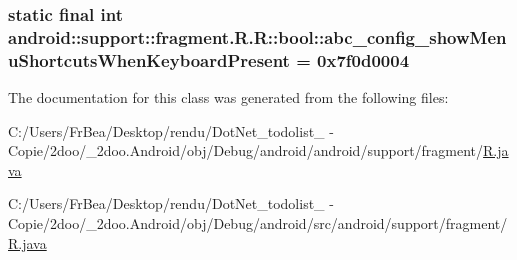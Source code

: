 \hypertarget{classandroid_1_1support_1_1fragment_1_1_r_1_1bool_09ff338b2b45baa2684ad6224df2544f}{
\subsubsection[{abc\_\-config\_\-showMenuShortcutsWhenKeyboardPresent}]{\setlength{\rightskip}{0pt plus 5cm}static final int android::support::fragment.R.R::bool::abc\_\-config\_\-showMenuShortcutsWhenKeyboardPresent = 0x7f0d0004}}
\label{classandroid_1_1support_1_1fragment_1_1_r_1_1bool_09ff338b2b45baa2684ad6224df2544f}




The documentation for this class was generated from the following files:\begin{CompactItemize}
\item 
C:/Users/FrBea/Desktop/rendu/DotNet\_\-todolist\_ - Copie/2doo/\_\-2doo.Android/obj/Debug/android/android/support/fragment/\hyperlink{android_2support_2fragment_2_r_8java}{R.java}\item 
C:/Users/FrBea/Desktop/rendu/DotNet\_\-todolist\_ - Copie/2doo/\_\-2doo.Android/obj/Debug/android/src/android/support/fragment/\hyperlink{src_2android_2support_2fragment_2_r_8java}{R.java}\end{CompactItemize}
